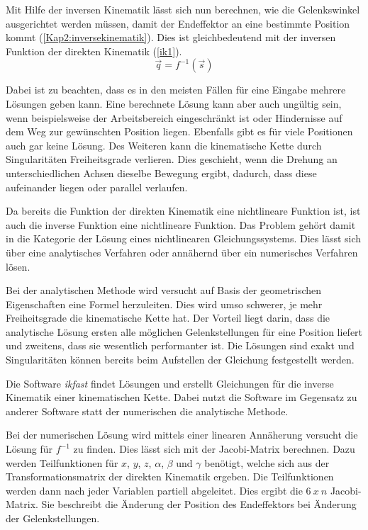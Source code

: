 Mit Hilfe der inversen Kinematik lässt sich nun berechnen, wie die Gelenkswinkel ausgerichtet werden müssen, damit der Endeffektor an eine bestimmte Position kommt (\autoref{Kap2:inversekinematik}). Dies ist gleichbedeutend mit der inversen Funktion der direkten Kinematik (\autoref{ik1}).
\begin{equation}
  \vec{q} = f^{-1}(\vec{s})
\label{ik1}
\end{equation}

Dabei ist zu beachten, dass es in den meisten Fällen für eine Eingabe mehrere Lösungen geben kann. Eine berechnete Lösung kann aber auch ungültig sein, wenn beispielsweise der Arbeitsbereich eingeschränkt ist oder Hindernisse auf dem Weg zur gewünschten Position liegen. Ebenfalls gibt es für viele Positionen auch gar keine Lösung. Des Weiteren kann die kinematische Kette durch Singularitäten Freiheitsgrade verlieren. Dies geschieht, wenn die Drehung an unterschiedlichen Achsen dieselbe Bewegung ergibt, dadurch, dass diese aufeinander liegen oder parallel verlaufen.

Da bereits die Funktion der direkten Kinematik eine nichtlineare Funktion ist, ist auch die inverse Funktion eine nichtlineare Funktion. Das Problem gehört damit in die Kategorie der Lösung eines nichtlinearen Gleichungssystems. Dies lässt sich über eine analytisches Verfahren oder annähernd über ein numerisches Verfahren lösen.

Bei der analytischen Methode wird versucht auf Basis der geometrischen Eigenschaften eine Formel herzuleiten. Dies wird umso schwerer, je mehr Freiheitsgrade die kinematische Kette hat. Der Vorteil liegt darin, dass die analytische Lösung ersten alle möglichen Gelenkstellungen für eine Position liefert und zweitens, dass sie wesentlich performanter ist. Die Lösungen sind exakt und Singularitäten können bereits beim Aufstellen der Gleichung festgestellt werden.

Die Software \emph{ikfast} \autocite{kanakia2012inverse} findet Lösungen und erstellt Gleichungen für die inverse Kinematik einer kinematischen Kette. Dabei nutzt die Software im Gegensatz zu anderer Software statt der numerischen die analytische Methode.

Bei der numerischen Lösung wird mittels einer linearen Annäherung versucht die Lösung für $f^{-1}$ zu finden. Dies lässt sich mit der Jacobi-Matrix berechnen. Dazu werden Teilfunktionen für $x$, $y$, $z$, $\alpha$, $\beta$ und $\gamma$ benötigt, welche sich aus der Transformationsmatrix der direkten Kinematik ergeben. Die Teilfunktionen werden dann nach jeder Variablen partiell abgeleitet. Dies ergibt die $6\:x\:n$ Jacobi-Matrix. Sie beschreibt die Änderung der Position des Endeffektors bei Änderung der Gelenkstellungen.

